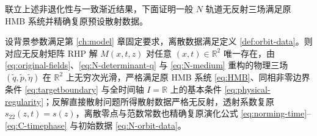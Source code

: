 联立上述非退化性与一致渐近结果，下面证明一般 $N$ 轨道无反射三场满足原 HMB 系统并精确复原预设散射数据。

\begin{theorem}\label{thm:general-N-HMB-reconstruction}
设背景参数满足第 \ref{ch:model} 章固定要求，离散数据满足定义 \ref{def:orbit-data}。则对应无反射矩阵 RHP 解 $M(x,t,z)$ 对任意 $(x,t)\in\mathbb R^2$ 唯一存在，由 \eqref{eq:original-fields}、\eqref{eq:N-determinant-q} 与 \eqref{eq:N-medium} 重构的物理三场 $(\widetilde q,\widetilde p,\widetilde\eta)$ 在 $\mathbb R^2$ 上无穷次光滑，严格满足原 HMB 系统 \eqref{eq:HMB}、同相非零边界条件 \eqref{eq:targetboundary} 与全时间轴 $I=\mathbb R$ 上的基本条件 \eqref{eq:physical-regularity}；反解直接散射问题所得散射数据严格无反射，透射系数复原 $s_{22}(z,t)=s(z)$，离散零点与范数常数也精确复原演化公式 \eqref{eq:norming-time}--\eqref{eq:C-timephase} 与初始数据 \eqref{eq:N-orbit-data}。
\end{theorem}
